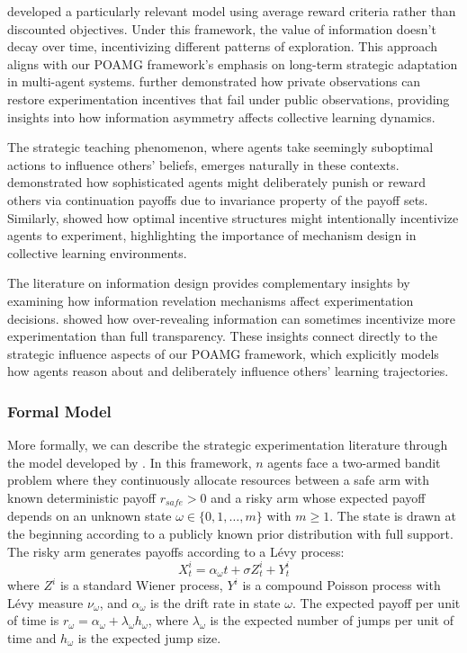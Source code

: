 \documentclass[a4paper,12pt]{report}
\begin{document}
\citet{keller2020undiscounted} developed a particularly relevant model using average reward criteria rather than discounted objectives. Under this framework, the value of information doesn't decay over time, incentivizing different patterns of exploration. This approach aligns with our POAMG framework's emphasis on long-term strategic adaptation in multi-agent systems. \citet{heidhues2015strategic} further demonstrated how private observations can restore experimentation incentives that fail under public observations, providing insights into how information asymmetry affects collective learning dynamics.

The strategic teaching phenomenon, where agents take seemingly suboptimal actions to influence others' beliefs, emerges naturally in these contexts. \citet{yamamoto2019stochastic} demonstrated how sophisticated agents might deliberately punish or reward others via continuation payoffs due to invariance property of the payoff sets. Similarly, \citet{halac2017designing} showed how optimal incentive structures might intentionally incentivize agents to experiment, highlighting the importance of mechanism design in collective learning environments.


The literature on information design \citep{kamenica2011bayesian, bergemann2019information} provides complementary insights by examining how information revelation mechanisms affect experimentation decisions. \citet{che2018optimal} showed how over-revealing information can sometimes incentivize more experimentation than full transparency. These insights connect directly to the strategic influence aspects of our POAMG framework, which explicitly models how agents reason about and deliberately influence others' learning trajectories.

\subsubsection{Formal Model}
More formally, we can describe the strategic experimentation literature through the model developed by \citet{keller2020undiscounted}. In this framework, $n$ agents face a two-armed bandit problem where they continuously allocate resources between a safe arm with known deterministic payoff $r_\textit{safe} > 0$ and a risky arm whose expected payoff depends on an unknown state $\omega \in \{0,1,\ldots,m\}$ with $m \geq 1$. The state is drawn at the beginning according to a publicly known prior distribution with full support. The risky arm generates payoffs according to a Lévy process:
\begin{equation*}
    X^i_t = \alpha_{\omega} t + \sigma Z^i_t + Y^i_t
\end{equation*}
where $Z^i$ is a standard Wiener process, $Y^i$ is a compound Poisson process with Lévy measure $\nu_{\omega}$, and $\alpha_{\omega}$ is the drift rate in state $\omega$. The expected payoff per unit of time is $r_{\omega} = \alpha_{\omega} + \lambda_{\omega} h_{\omega}$, where $\lambda_{\omega}$ is the expected number of jumps per unit of time and $h_{\omega}$ is the expected jump size.
\end{document}
